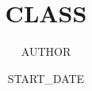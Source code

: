 \documentclass[working]{article}
\title{CLASS}
\author{AUTHOR}
\date{START_DATE}
\begin{document}
  \createintro


  \listnotes
\end{document}

